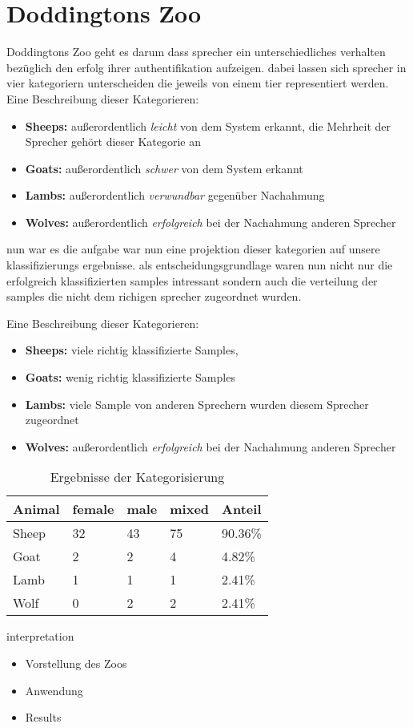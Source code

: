 \section{Doddingtons Zoo}


Doddingtons Zoo
geht es darum dass sprecher ein unterschiedliches verhalten bezüglich den erfolg ihrer authentifikation aufzeigen. \cite{zoo}
dabei lassen sich sprecher in vier kategoriern unterscheiden die jeweils von einem tier representiert werden. \\

Eine Beschreibung dieser Kategorieren:
\begin{itemize}
	\item \textbf{Sheeps:} außerordentlich \textit{leicht} von dem System erkannt, die Mehrheit der Sprecher gehört dieser Kategorie an
	\item \textbf{Goats:} außerordentlich \textit{schwer} von dem System erkannt
	\item \textbf{Lambs:} außerordentlich \textit{verwundbar} gegenüber Nachahmung
	\item \textbf{Wolves:} außerordentlich \textit{erfolgreich} bei der Nachahmung anderen Sprecher
\end{itemize}
\cite{dittmann}


nun war es die aufgabe war nun eine projektion dieser kategorien auf unsere klassifizierungs ergebnisse. als entscheidungsgrundlage waren nun nicht nur  die erfolgreich klassifizierten samples intressant sondern auch die verteilung der samples die nicht dem richigen sprecher zugeordnet wurden.

Eine Beschreibung dieser Kategorieren:
\begin{itemize}
	\item \textbf{Sheeps:} viele richtig klassifizierte Samples, 
	\item \textbf{Goats:} wenig richtig klassifizierte Samples
	\item \textbf{Lambs:} viele Sample von anderen Sprechern wurden diesem Sprecher zugeordnet
	\item \textbf{Wolves:} außerordentlich \textit{erfolgreich} bei der Nachahmung anderen Sprecher
\end{itemize}



\begin{table}[h]
	\centering
    \begin{tabular}{ | l | l | l | l | l |}
    \hline
    Animal & female & male & mixed & Anteil \\ \hline 
    Sheep 	& 32 	& 43	&	75	&	90.36\%	\\ \hline
    Goat	& 2		& 2		& 4 	&	4.82\% \\ \hline
    Lamb	& 1  	& 1		& 1		&	2.41\% \\ \hline
    Wolf	& 0  	& 2 	& 2		&	2.41\% \\ \hline
    \end{tabular}
    \caption{Ergebnisse der Kategorisierung}
   \label{table:resultsZoo}
\end{table}


interpretation


\begin{itemize}
	\item Vorstellung des Zoos
	\item Anwendung
	\item Results
\end{itemize}